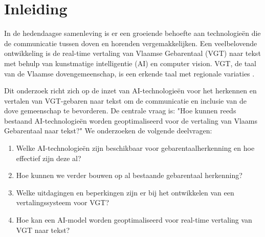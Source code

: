 


% 
\newcommand{\figref}[1]{(Zie \hyperref[#1]{figuur: \ref{#1}})}

\section{Inleiding}%
\label{sec:inleiding}

In de hedendaagse samenleving is er een groeiende behoefte aan technologieën die de communicatie tussen doven en horenden vergemakkelijken. Een veelbelovende ontwikkeling is de real-time vertaling van Vlaamse Gebarentaal (VGT) naar tekst met behulp van kunstmatige intelligentie (AI) en computer vision. VGT, de taal van de Vlaamse dovengemeenschap, is een erkende taal met regionale variaties \autocite{vanmeerbergen2000simultane}.

Dit onderzoek richt zich op de inzet van AI-technologieën voor het herkennen en vertalen van VGT-gebaren naar tekst om de communicatie en inclusie van de dove gemeenschap te bevorderen. De centrale vraag is: "Hoe kunnen reeds bestaand AI-technologieën worden geoptimaliseerd voor de vertaling van Vlaams Gebarentaal naar tekst?" We onderzoeken de volgende deelvragen:

\begin{enumerate} 
  \item Welke AI-technologieën zijn beschikbaar voor gebarentaalherkenning en hoe effectief zijn deze al? 
  \item Hoe kunnen we verder bouwen op al bestaande gebarentaal herkenning? 
  \item Welke uitdagingen en beperkingen zijn er bij het ontwikkelen van een vertalingssysteem voor VGT? 
  \item Hoe kan een AI-model worden geoptimaliseerd voor real-time vertaling van VGT naar tekst?
\end{enumerate}

